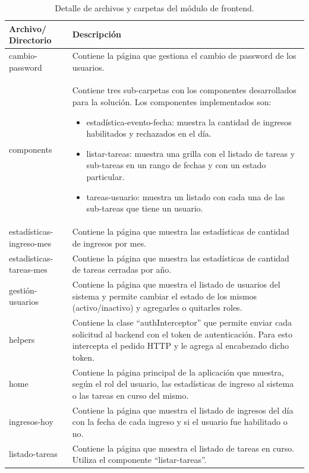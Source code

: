 \begin{table}[h]
	\centering
	\caption[Detalle de archivos y carpetas del módulo de frontend]{Detalle de archivos y carpetas del módulo de frontend.}
	\begin{tabular}{p{2.3cm} p{10.7cm}} 	
		\toprule
		\textbf{Archivo/
		Directorio} & 
		\textbf{Descripción} 
		\\
		\midrule
cambio-password & Contiene la página que gestiona el cambio de password de los usuarios. \\
\hline
components & Contiene tres sub-carpetas con los componentes desarrollados para la solución. Los componentes implementados son:
\begin{itemize}
\item estadística-evento-fecha: muestra la cantidad de ingresos habilitados y rechazados en el día.
\item listar-tareas: muestra una grilla con el listado de tareas y sub-tareas en un rango de fechas y con un estado particular. 
\item tareas-usuario: muestra un listado con cada una de las sub-tareas que tiene un usuario.
\end{itemize} \\
\hline
estadísticas-ingreso-mes & Contiene la página que muestra las estadísticas de cantidad de ingresos por mes.\\
\hline
estadisticas-tareas-mes & Contiene la página que muestra las estadísticas de cantidad de tareas cerradas por año.\\
\hline
gestión-usuarios & Contiene la página que muestra el listado de usuarios del sistema y permite cambiar el estado de los mismos (activo/inactivo) y agregarles o quitarles roles. \\
\hline
helpers & Contiene la clase ``authInterceptor'' que permite enviar cada solicitud al backend con el token de autenticación. Para esto intercepta el pedido HTTP y le agrega al encabezado dicho token. \\
\hline
home & Contiene la página principal de la aplicación que muestra, según el rol del usuario, las estadísticas de ingreso al sistema o las tareas en curso del mismo.\\
\hline
ingresos-hoy & Contiene la página que muestra el listado de ingresos del día con la fecha de cada ingreso y si el usuario fue habilitado o no. \\
\hline
listado-tareas & Contiene la página que muestra el listado de tareas en curso. Utiliza el componente ``listar-tareas''. \\

\end{tabular}
\end{table}
